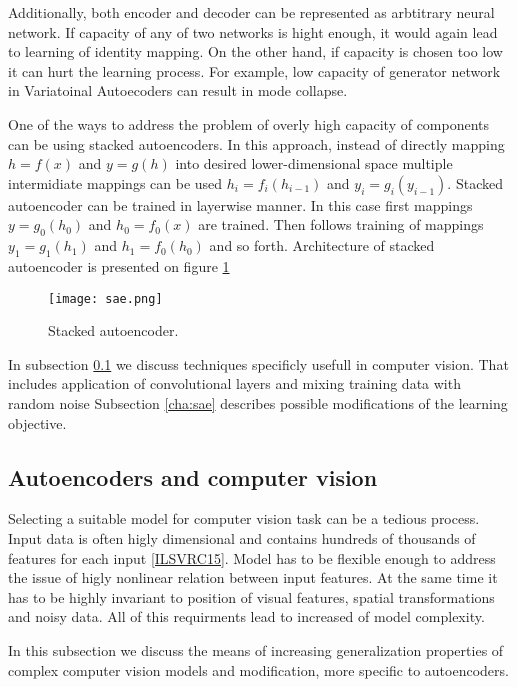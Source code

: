 Additionally, both encoder and decoder can be represented as arbtitrary neural network.
If capacity of any of two networks is hight enough, it would again lead to learning of identity mapping.
On the other hand, if capacity is chosen too low it can hurt the learning process.
For example, low capacity of generator network in Variatoinal Autoecoders can result in mode collapse.

One of the ways to address the problem of overly high capacity of components can be using stacked autoencoders.
In this approach, instead of directly mapping $h=f(x)$ and $y=g(h)$ into desired lower-dimensional space multiple intermidiate mappings can be used $h_i=f_i(h_{i-1})$ and $y_i=g_i(y_{i-1})$.
Stacked autoencoder can be trained in layerwise manner.
In this case first mappings $y=g_0(h_0)$ and $h_0=f_0(x)$ are trained.
Then follows training of mappings $y_1=g_1(h_1)$ and $h_1=f_0(h_0)$ and so forth.
Architecture of stacked autoencoder is presented on figure \ref{fig:sae}

\begin{figure}[h!]
  \centering
    \texttt{[image: sae.png]}
  \caption{Stacked autoencoder.}
  \label{fig:sae}
\end{figure}

In subsection \ref{cha:dcae} we discuss techniques specificly usefull in computer vision.
That includes application of convolutional layers and mixing training data with random noise
Subsection \ref{cha:sae} describes possible modifications of the learning objective.


\subsection{Autoencoders and computer vision}\label{cha:dcae}

Selecting a suitable model for computer vision task can be a tedious process.
Input data is often higly dimensional and contains hundreds of thousands of features for each input \ref{ILSVRC15}.
Model has to be flexible enough to address the issue of higly nonlinear relation between input features.
At the same time it has to be highly invariant to position of visual features, spatial transformations and noisy data.
All of this requirments lead to increased of model complexity.

In this subsection we discuss the means of increasing generalization properties of complex computer vision models and modification, more specific to autoencoders.

